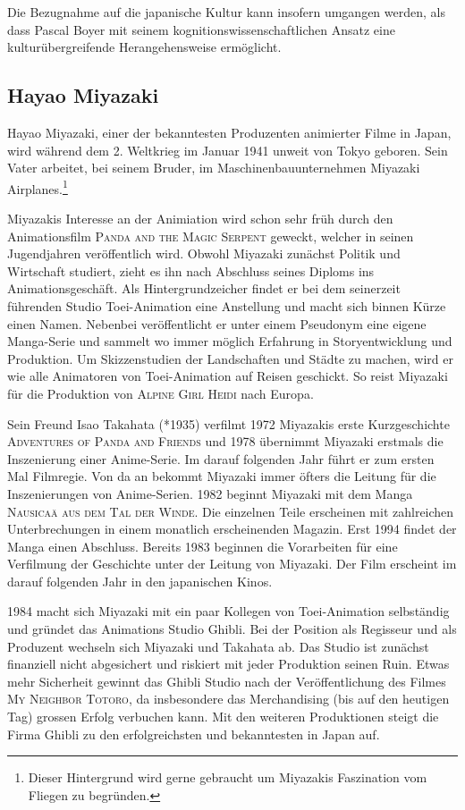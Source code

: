 Die Bezugnahme auf die japanische Kultur kann insofern umgangen werden, als dass Pascal Boyer mit seinem kognitionswissenschaftlichen Ansatz eine kulturübergreifende Herangehensweise ermöglicht.

\subsection{Hayao Miyazaki}
Hayao Miyazaki, einer der bekanntesten Produzenten animierter Filme in Japan, wird während dem 2. Weltkrieg im Januar 1941 unweit von Tokyo geboren. Sein Vater arbeitet, bei seinem Bruder, im Maschinenbauunternehmen Miyazaki Airplanes.\footnote{Dieser Hintergrund wird gerne gebraucht um Miyazakis Faszination vom Fliegen zu begründen.} 

Miyazakis Interesse an der Animiation wird schon sehr früh durch den Animationsfilm \textsc{Panda and the Magic Serpent} geweckt, welcher in seinen Jugendjahren veröffentlich wird. Obwohl Miyazaki zunächst Politik und Wirtschaft studiert, zieht es ihn nach Abschluss seines Diploms ins Animationsgeschäft. Als Hintergrundzeicher findet er bei dem seinerzeit führenden Studio Toei-Animation eine Anstellung und macht sich binnen Kürze einen Namen. Nebenbei veröffentlicht er unter einem Pseudonym eine eigene Manga-Serie und sammelt wo immer möglich Erfahrung in Storyentwicklung und Produktion. Um Skizzenstudien der Landschaften und Städte zu machen, wird er wie alle Animatoren von Toei-Animation auf Reisen geschickt. So reist Miyazaki für die Produktion von \textsc{Alpine Girl Heidi} nach Europa.

Sein Freund Isao Takahata (*1935) verfilmt 1972 Miyazakis erste Kurzgeschichte \textsc{Adventures of Panda and Friends} und 1978 übernimmt Miyazaki erstmals die Inszenierung einer Anime-Serie. Im darauf folgenden Jahr führt er zum ersten Mal Filmregie. Von da an bekommt Miyazaki immer öfters die Leitung für die Inszenierungen von Anime-Serien. 1982 beginnt Miyazaki mit dem Manga \textsc{Nausicaä aus dem Tal der Winde}. Die einzelnen Teile erscheinen mit zahlreichen Unterbrechungen in einem monatlich erscheinenden Magazin. Erst 1994 findet der Manga einen Abschluss. Bereits 1983 beginnen die Vorarbeiten für eine Verfilmung der Geschichte unter der Leitung von Miyazaki. Der Film erscheint im darauf folgenden Jahr in den japanischen Kinos. 

1984 macht sich Miyazaki mit ein paar Kollegen von Toei-Animation selbständig und gründet das Animations Studio Ghibli. Bei der Position als Regisseur und als Produzent wechseln sich Miyazaki und Takahata ab. Das Studio ist zunächst finanziell nicht abgesichert und riskiert mit jeder Produktion seinen Ruin. Etwas mehr Sicherheit gewinnt das Ghibli Studio nach der Veröffentlichung des Filmes \textsc{My Neighbor Totoro}, da insbesondere das Merchandising (bis auf den heutigen Tag) grossen Erfolg verbuchen kann. Mit den weiteren Produktionen steigt die Firma Ghibli zu den erfolgreichsten und bekanntesten in Japan auf. 

